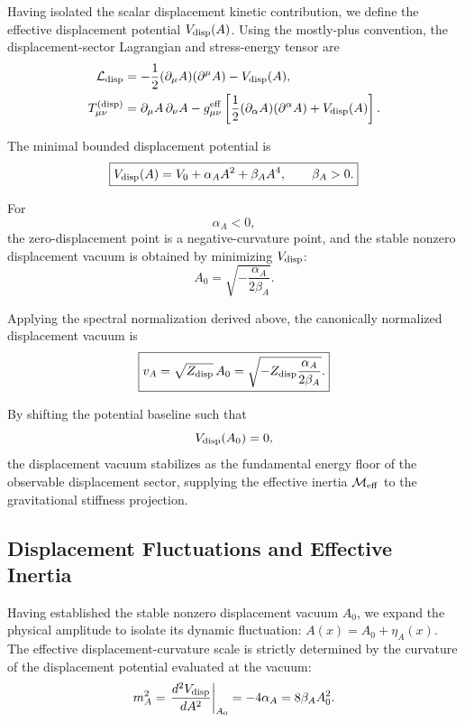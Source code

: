 \documentclass[11pt]{article}
\begin{document}
Having isolated the scalar displacement kinetic contribution, we define the effective displacement potential \cite{higgs1964,  Goldstone1961} \(V_{\rm disp}(A)\). Using the mostly-plus convention, the displacement-sector Lagrangian and stress-energy tensor are
\begin{align}
\mathcal L_{\rm disp}
&=
-\frac{1}{2}
(\partial_\mu A)(\partial^\mu A)
-
V_{\rm disp}(A),
\\
T_{\mu\nu}^{(\rm disp)}
&=
\partial_\mu A\,\partial_\nu A
-
g_{\mu\nu}^{\rm eff}
\left[
\frac{1}{2}
(\partial_\alpha A)(\partial^\alpha A)
+
V_{\rm disp}(A)
\right].
\end{align}

The minimal bounded displacement potential is
\begin{equation}
\boxed{
V_{\rm disp}(A)
=
V_0+\alpha_AA^2+\beta_AA^4,
\qquad
\beta_A>0.
}
\end{equation}

For
\begin{equation}
\alpha_A<0,
\end{equation}
the zero-displacement point is a negative-curvature point, and the stable nonzero displacement vacuum is obtained by minimizing \(V_{\rm disp}\):
\begin{equation}
\boxed{
A_0
=
\sqrt{
-\frac{\alpha_A}{2\beta_A}
}.
}
\end{equation}

Applying the spectral normalization derived above, the canonically normalized displacement vacuum is
\begin{equation}
\boxed{
v_A
=
\sqrt{Z_{\rm disp}}\,A_0
=
\sqrt{
-Z_{\rm disp}\frac{\alpha_A}{2\beta_A}
}.
}
\end{equation}

By shifting the potential baseline such that
\begin{equation}
V_{\rm disp}(A_0)=0,
\end{equation}
the displacement vacuum stabilizes as the fundamental energy floor of the observable displacement sector, supplying the effective inertia \(\mathcal M_{\rm eff}\) to the gravitational stiffness projection.

\subsection{Displacement Fluctuations and Effective Inertia}
\label{sec:displacement_fluctuations_inertia}

Having established the stable nonzero displacement vacuum $A_0$, we expand the physical amplitude to isolate its dynamic fluctuation: $A(x) = A_0 + \eta_A(x)$. The effective displacement-curvature scale is strictly determined by the curvature of the displacement potential evaluated at the vacuum:
\begin{equation}
m_A^2 = \left. \frac{d^2 V_{\rm disp}}{dA^2} \right|_{A_0} = -4\alpha_A = 8\beta_A A_0^2.
\end{equation}
\end{document}
